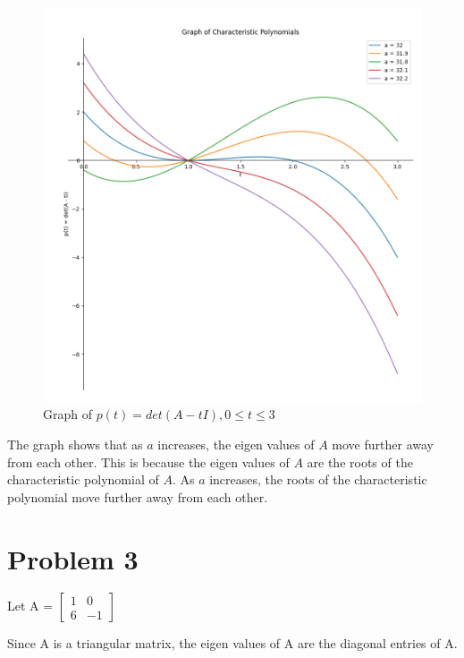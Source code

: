 \documentclass[12pt, a4paper]{article}
\begin{document}
\begin{figure}[htbp]
    \centerline{\includegraphics[scale=0.7]{graph.png}}
    \caption{Graph of $p(t) = det(A -tI), 0 \le t \le 3$}
\end{figure}

\newpage

The graph shows that as $a$ increases, the eigen values of $A$ move further away from each other. This is because the eigen values of $A$ are the roots of the characteristic polynomial of $A$. As $a$ increases, the roots of the characteristic polynomial move further away from each other.

\section*{Problem 3}

\begin{center}
    Let A = $\begin{bmatrix}
        1 & 0 \\
        6 & -1
    \end{bmatrix}$
\end{center}
Since A is a triangular matrix, the eigen values of A are the diagonal entries of A.
\end{document}
